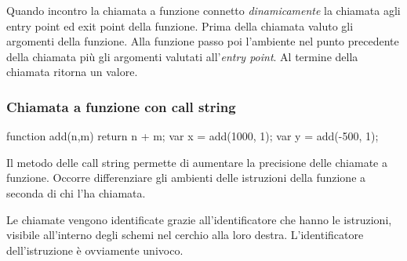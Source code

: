 Quando incontro la chiamata a funzione connetto \emph{dinamicamente} la chiamata agli entry point ed exit point della funzione. Prima della chiamata valuto gli argomenti della funzione. Alla funzione passo poi l'ambiente nel punto precedente della chiamata più gli argomenti valutati all'\emph{entry point}. Al termine della chiamata ritorna un valore. 

\subsubsection{Chiamata a funzione con call string}\label{sec:callstring:internal}
\begin{javascriptcode}
function add(n,m) {
    return n + m;
}
var x = add(1000, 1);
var y = add(-500, 1);
\end{javascriptcode}
Il metodo delle call string permette di aumentare la precisione delle chiamate a funzione. Occorre differenziare gli ambienti delle istruzioni della funzione a seconda di chi l'ha chiamata.

Le chiamate vengono identificate grazie all'identificatore che hanno le istruzioni, visibile all'interno degli schemi nel cerchio alla loro destra. L'identificatore dell'istruzione è ovviamente univoco.

